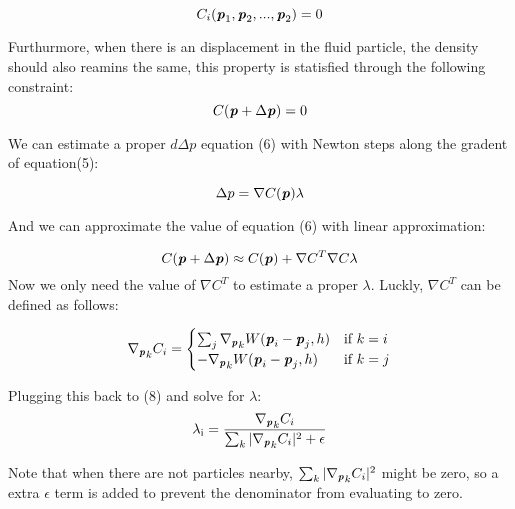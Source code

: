 \documentclass[acmtog]{acmart}
\begin{document}
\begin{equation}
  C_i(\textbf{\textit{p}}_{1}, \textbf{\textit{p}}_{2}, ... , \textbf{\textit{p}}_{2}) = 0
\end{equation}

Furthurmore, when there is an displacement in the fluid particle, the density should also reamins the same, 
this property is statisfied through the following constraint:
\begin{equation}
  C(\textbf{\textit{p}} + \Delta \textbf{\textit{p}}) = 0
\end{equation}

We can estimate a proper $d\Delta p$ equation (6) with Newton steps along the gradent of equation(5):

\begin{equation}
  \Delta p = \nabla C(\textbf{\textit{p}}) \lambda 
\end{equation}

And we can approximate the value of equation (6) with linear approximation:

\begin{equation}
  C(\textbf{\textit{p}} + \Delta \textbf{\textit{p}}) \approx C(\textbf{\textit{p}}) + \nabla C^T \nabla C \lambda 
\end{equation}
Now we only need the value of $\nabla C^T$ to estimate a proper $\lambda$. 
Luckly, $\nabla C^T$ can be defined as follows:

\begin{equation}
  \nabla \textsubscript{\textbf{\textit{p}}}_{k} C_i = 
  \begin{cases}
    \sum_{j} \nabla \textsubscript{\textbf{\textit{p}}}_{k} W(\textbf{\textit{p}}_{i} - \textbf{\textit{p}}_{j}, h) & \text{if $k=i$} \\
    - \nabla \textsubscript{\textbf{\textit{p}}}_{k} W(\textbf{\textit{p}}_{i} - \textbf{\textit{p}}_{j}, h) & \text{if $k=j$}
  \end{cases}
\end{equation}

Plugging this back to (8) and solve for $\lambda$:
 \begin{equation}
   \lambda \textsubscript{i} = \frac{\nabla \textsubscript{\textbf{\textit{p}}}_{k} C_i}{\sum_{k} |\nabla \textsubscript{\textbf{\textit{p}}}_{k} C_i|^2 + \epsilon}
 \end{equation}

Note that when there are not particles nearby, $\sum_{k} |\nabla \textsubscript{\textbf{\textit{p}}}_{k} C_i|^2$ might be zero, 
so a extra $\epsilon$ term is added to prevent the denominator from evaluating to zero.
\end{document}
